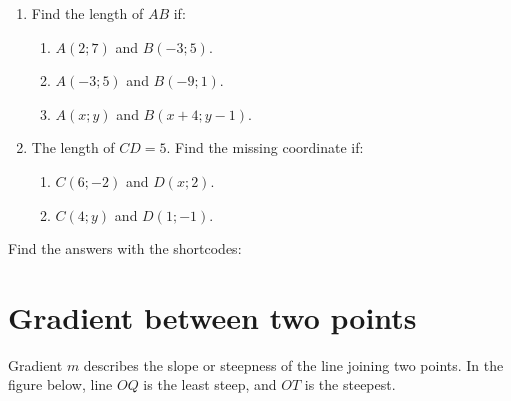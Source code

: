\begin{exercises}{}{
\begin{enumerate}[label=\textbf{\arabic*}.]
\item Find the length of $AB$ if:
 \begin{enumerate}[noitemsep, label=\textbf{(\alph*)} ] 
\item $A(2;7)$ and $B(-3;5)$.
\item $A(-3;5)$ and $B(-9;1)$.
\item $A(x;y)$ and $B(x+4;y-1)$.
\end{enumerate}

\item The length of $CD=5$. Find the missing coordinate if:
 \begin{enumerate}[noitemsep, label=\textbf{(\alph*)} ] 
\item $C(6;-2)$ and $D(x;2)$.
\item $C(4;y)$ and $D(1;-1)$.
\end{enumerate}
\end{enumerate}

Find the answers with the shortcodes:}
\end{exercises}

%     
%     
%     

\section{Gradient between two points}
Gradient $m$ describes the slope or steepness of the line joining two points. In the figure below, line $OQ$ is the least steep, and $OT$ is the steepest.

